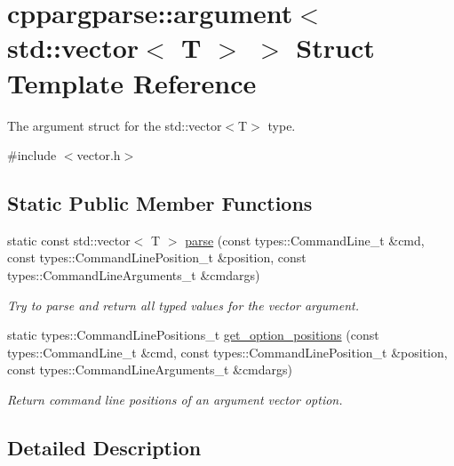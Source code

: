 \hypertarget{structcppargparse_1_1argument_3_01std_1_1vector_3_01T_01_4_01_4}{}\section{cppargparse\+:\+:argument$<$ std\+:\+:vector$<$ T $>$ $>$ Struct Template Reference}
\label{structcppargparse_1_1argument_3_01std_1_1vector_3_01T_01_4_01_4}


The argument struct for the std\+::vector$<$\+T$>$ type.  




{\ttfamily \#include $<$vector.\+h$>$}

\subsection*{Static Public Member Functions}
\begin{DoxyCompactItemize}
\item 
static const std\+::vector$<$ T $>$ \hyperlink{structcppargparse_1_1argument_3_01std_1_1vector_3_01T_01_4_01_4_ada258269ddf190ae8376a6bb807de588}{parse} (const types\+::\+Command\+Line\+\_\+t \&cmd, const types\+::\+Command\+Line\+Position\+\_\+t \&position, const types\+::\+Command\+Line\+Arguments\+\_\+t \&cmdargs)
\begin{DoxyCompactList}\small\item\em Try to parse and return all typed values for the vector argument. \end{DoxyCompactList}\item 
static types\+::\+Command\+Line\+Positions\+\_\+t \hyperlink{structcppargparse_1_1argument_3_01std_1_1vector_3_01T_01_4_01_4_a57aaaece7f0d299010f47a9bbfbe5e70}{get\+\_\+option\+\_\+positions} (const types\+::\+Command\+Line\+\_\+t \&cmd, const types\+::\+Command\+Line\+Position\+\_\+t \&position, const types\+::\+Command\+Line\+Arguments\+\_\+t \&cmdargs)
\begin{DoxyCompactList}\small\item\em Return command line positions of an argument vector option. \end{DoxyCompactList}\end{DoxyCompactItemize}


\subsection{Detailed Description}
